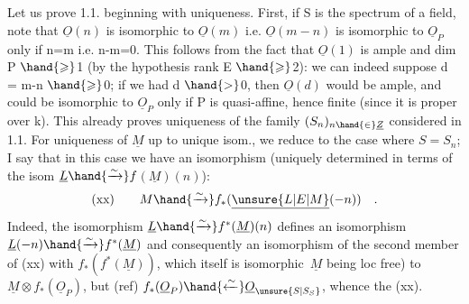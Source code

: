 Let us prove 1.1. beginning with uniqueness. First, if S is
the spectrum of a field, note that $\underline{O}(n)$ is isomorphic to $\underline{O}(m)$ i.e.
$\underline{O}(m-n)$ is isomorphic to $\underline{O}_P$ only if n=m i.e. n-m=0. This follows
from the fact that $\underline{O}(1)$ is ample and dim P $\hand{\geqslant}$1 (by the hypothesis rank E $\hand{\geqslant}$2):
we can indeed suppose d = m-n $\hand{\geqslant}$0; if we had d $\hand{>}$0, then $\underline{O}(d)$
would be ample, and could be isomorphic to $\underline{O}_P$ only if P is quasi-affine,
hence finite (since it is proper over k). This already proves uniqueness
of the family $(S_n)_{n\hand{\in}\underline{Z}}$ considered in 1.1. For uniqueness of $\underline{M}$ up to unique
isom., we reduce to the case where $S=S_n$; I say that in this case we have
an isomorphism (uniquely determined in terms of the isom $\underline{L} \hand{\xrightarrow{\sim}} f$$(\underline{M})(n)$):
\[ \text{(xx)} \qquad M \hand{\xrightarrow{\sim}} f_*(\underline{\unsure{L|E|M}}(-n)) \quad . \]
Indeed, the isomorphism $\underline{L} \hand{\xrightarrow{\sim}} f^*(\underline{M})(n)$ defines an isomorphism
$\underline{L}(-n) \hand{\xrightarrow{\sim}} f^*(\underline{M})$ and consequently an isomorphism of the second member of (xx)
with $f_*(f^*(\underline{M}))$, which itself is isomorphic \,$\underline{M}$ being loc free) to
$\underline{M}\otimes f_*(\underline{O}_P)$, but (ref) $f_*(\underline{O}_P) \hand{\xleftarrow{\sim}} \underline{O}_{\unsure{S|S_S}}$, whence the  (xx).

